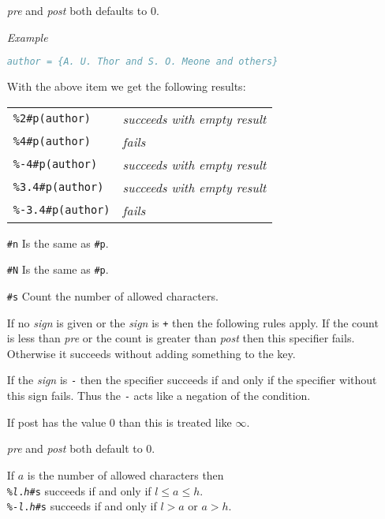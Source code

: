 \documentclass[11pt,a4paper]{scrbook}
\newenvironment{Example}{\smallskip\par\textit{Example}\par}{\smallskip\par}
\begin{document}
\begin{itemize}
    \textit{pre} and \textit{post} both defaults to 0.

    \begin{Example}
      \begin{lstlisting}[language=BibTeX]
  author = {A. U. Thor and S. O. Meone and others}
      \end{lstlisting}\vspace{-2ex}
      With the above item we get the following results:

      \begin{tabular}{ll}
        \texttt{\%2\#p(author)}		& \textit{succeeds with empty result}	\\
        \texttt{\%4\#p(author)}		& \textit{fails}	\\
        \texttt{\%-4\#p(author)}	& \textit{succeeds with empty result}	\\
        \texttt{\%3.4\#p(author)}	& \textit{succeeds with empty result}	\\
        \texttt{\%-3.4\#p(author)}	& \textit{fails}
      \end{tabular}
    \end{Example}
    
  \item [\texttt{\#n}] Is the same as \texttt{\#p}.

  \item [\texttt{\#N}] Is the same as \texttt{\#p}.

  \item [\texttt{\#s}] Count the number of allowed characters.

    If no \textit{sign} is given or the \textit{sign} is \verb|+| then the
    following rules apply. If the count is less than \textit{pre} or the count
    is greater than \textit{post} then this specifier fails. Otherwise it
    succeeds without adding something to the key.

    If the \textit{sign} is \verb|-| then the specifier succeeds if and only
    if the specifier without this sign fails. Thus the \verb|-| acts like a
    negation of the condition.

    If post has the value 0 than this is treated like \(\infty\).

    \textit{pre} and \textit{post} both default to 0.

    If \(a\) is the number of allowed characters then\\
    \texttt{\%\textit{l}.\textit{h}\#s} succeeds if and only if
    \(l\leq a\leq h\).\\
    \texttt{\%-\textit{l}.\textit{h}\#s} succeeds if and only if \(l>a\) or
    \(a>h\).


\end{itemize}
\end{document}
